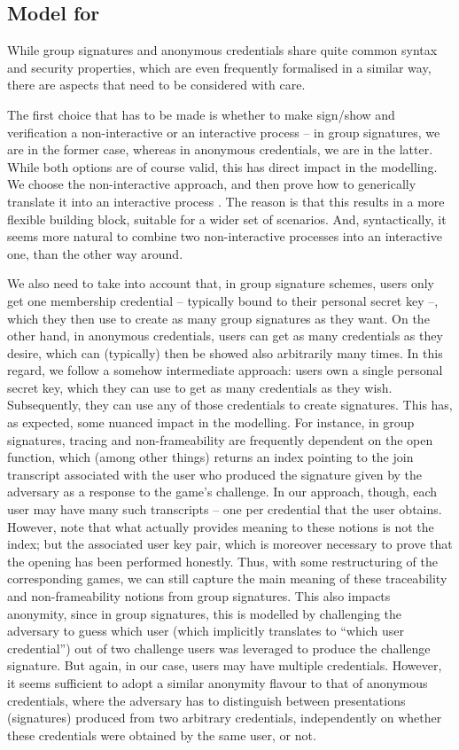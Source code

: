 \subsection{Model for \GSAC}
\label{ssec:model-gsac}

While group signatures and anonymous credentials share quite common syntax and
security properties, which are even frequently formalised in a similar way,
there are aspects that need to be considered with care.

The first choice that has to be made is whether to make sign/show and
verification a non-interactive or an interactive process -- in group signatures,
we are in the former case, whereas in anonymous credentials, we are in the
latter. While both options are of course valid, this has direct impact in the
modelling. We choose the non-interactive approach, and then prove how to
generically translate it into an interactive process . The reason
is that this results in a more flexible building block, suitable for a wider set
of scenarios. And, syntactically, it seems more natural to combine two
non-interactive processes into an interactive one, than the other way around.

We also need to take into account that, in group signature schemes, users only
get one membership credential -- typically bound to their personal secret
key --, which they then use to create as many group signatures as they want. On
the other hand, in anonymous credentials, users can get as many credentials as
they desire, which can (typically) then be showed also arbitrarily many times.
In this regard, we follow a somehow intermediate approach: users own a single
personal secret key, which they can use to get as many credentials as they wish.
Subsequently, they can use any of those credentials to create \GSAC signatures.
This has, as expected, some nuanced impact in the modelling. For instance, in
group signatures, tracing and non-frameability are frequently dependent on the
open function, which (among other things) returns an index pointing to the join
transcript associated with the user who produced the signature given by the
adversary as a response to the game's challenge. In our approach, though, each
user may have many such transcripts -- one per credential that the user
obtains. However, note that what actually provides meaning to these notions
is not the index; but the associated user key pair, which is moreover necessary
to prove that the opening has been performed honestly. Thus, with some
restructuring of the corresponding games, we can still capture the main
meaning of these traceability and non-frameability notions from group
signatures. This also impacts anonymity, since in group signatures, this is
modelled by challenging the adversary to guess which user (which implicitly
translates to ``which user credential'') out of two challenge users was
leveraged to produce the challenge signature. But again, in our case, users may
have multiple credentials. However, it seems sufficient to adopt a similar
anonymity flavour to that of anonymous credentials, where the adversary has to
distinguish between presentations (signatures) produced from two arbitrary
credentials, independently on whether these credentials were obtained by the
same user, or not.

